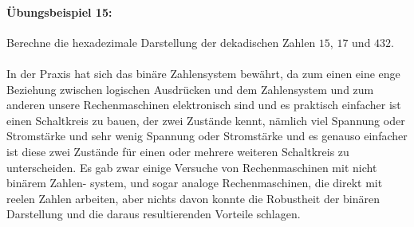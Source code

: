 \documentclass[11pt,a4paper,leqno]{report}
\numberwithin{equation}{chapter}
\begin{document}
\paragraph{\"Ubungsbeispiel 15:} Berechne die hexadezimale Darstellung der dekadischen Zahlen $15$, $17$ und $432$.\\
\\
In der Praxis hat sich das bin\"are Zahlensystem bew\"ahrt, da zum einen eine enge Beziehung zwischen logischen Ausdr\"ucken und dem Zahlensystem und zum anderen unsere Rechenmaschinen elektronisch sind und es praktisch einfacher ist einen Schaltkreis zu bauen, der zwei Zust\"ande kennt, n\"amlich viel Spannung oder Stromst\"arke und sehr wenig Spannung oder Stromst\"arke und es genauso einfacher ist diese zwei Zust\"ande f\"ur einen oder mehrere weiteren Schaltkreis zu unterscheiden. Es gab zwar einige Versuche von Rechenmaschinen mit nicht bin\"arem Zahlen- system, und sogar analoge Rechenmaschinen, die direkt mit reelen Zahlen arbeiten, aber nichts davon konnte die Robustheit der bin\"aren Darstellung und die daraus resultierenden Vorteile schlagen.


\newpage
\end{document}
